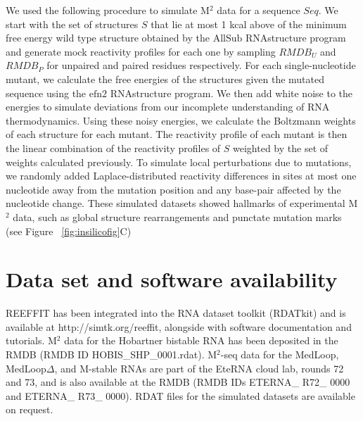 \documentclass[12pt]{article}
\begin{document}
We used the following procedure to simulate M$^2$ data for a sequence $Seq$. We start with the set of structures $S$ that lie at most 1 kcal above of the minimum free energy wild type structure obtained by the $\mbox{AllSub}$ RNAstructure program and generate mock reactivity profiles for each one by sampling $RMDB_U$ and $RMDB_P$ for unpaired and paired residues respectively. For each single-nucleotide mutant, we calculate the free energies of the structures given the mutated sequence using the $\mbox{efn2}$ RNAstructure program. We then add white noise to the energies to simulate deviations from our incomplete understanding of RNA thermodynamics. Using these noisy energies, we calculate the Boltzmann weights of each structure for each mutant. The reactivity profile of each mutant is then the linear combination of the reactivity profiles of $S$ weighted by the set of weights calculated previously. To simulate local perturbations due to mutations, we randomly added Laplace-distributed reactivity differences in sites at most one nucleotide away from the mutation position and any base-pair affected by the nucleotide change. These simulated datasets showed hallmarks of experimental M$^2$ data, such as global structure rearrangements  and punctate mutation marks (see Figure ~\ref{fig:insilicofig}C)



\section{Data set and software availability}

REEFFIT has been integrated into the RNA dataset toolkit (RDATkit) and is available at http://simtk.org/reeffit, alongside with software documentation and tutorials. M$^2$ data for the Hobartner bistable RNA has been deposited in the RMDB (RMDB ID HOBIS\_SHP\_0001.rdat). M$^2$-seq data for the MedLoop, MedLoop$\Delta$, and M-stable RNAs are part of the EteRNA cloud lab, rounds 72 and 73, and is also available at the RMDB (RMDB IDs ETERNA\_ R72\_ 0000 and ETERNA\_ R73\_ 0000). RDAT files for the simulated datasets are available on request.



\end{document}
